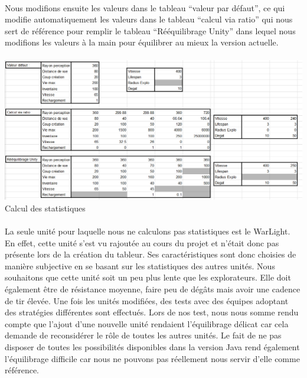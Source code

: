 \documentclass{report}
\begin{document}
\paragraph{}
Nous modifions ensuite les valeurs dans le tableau “valeur par défaut”, ce qui modifie automatiquement les valeurs dans le tableau “calcul via ratio” qui nous sert de référence pour remplir le tableau “Rééquilibrage Unity” dans lequel nous modifions les valeurs à la main pour équilibrer au mieux la version actuelle.

\paragraph{}
\begin{adjustwidth}{-3em}{}
\includegraphics[scale=0.45]{DATA/equilibrage.png}
 {Calcul des statistiques}
\end{adjustwidth}
\paragraph{}

    La seule unité pour laquelle nous ne calculons pas statistiques est le WarLight. En effet, cette unité s’est vu rajoutée au cours du projet et n’était donc pas présente lors de la création du tableur. Ses caractéristiques sont donc choisies de manière subjective en se basant sur les statistiques des autres unités. Nous souhaitons que cette unité soit un peu plus lente que les explorateurs. Elle doit également être de résistance moyenne, faire peu de dégâts mais avoir une cadence de tir élevée. \newline
Une fois les unités modifiées, des tests avec des équipes adoptant des stratégies différentes sont effectués. Lors de nos test, nous nous somme rendu compte que l’ajout d’une nouvelle unité rendaient l’équilibrage délicat car cela demande de reconsidérer le rôle de toutes les autres unités. Le fait de ne pas disposer de toutes les possibilités disponibles dans la version Java rend également l’équilibrage difficile car nous ne pouvons pas réellement nous servir d’elle comme référence.
\end{document}
